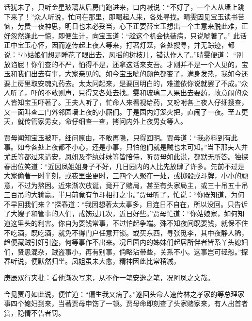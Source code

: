 \begin{parag}
    话犹未了，只听金星玻璃从后房门跑进来，口内喊说：“不好了，一个人从墙上跳下来了！”众人听说，忙问在那里，即喝起人来，各处寻找。晴雯因见宝玉读书苦恼，劳费一夜神思，明日也未必妥当，心下正要替宝玉想出一个主意来脱此难，正好忽然逢此一惊，即便生计，向宝玉道：“趁这个机会快装病，只说唬著了。” 此话正中宝玉心怀，因而遂传起上夜人等来，打著灯笼，各处搜寻，并无踪迹，都说：“小姑娘们想是睡花了眼出去，风摇的树枝儿，错认作人了。”晴雯便道： “别放诌屁！你们查的不严，怕得不是，还拿这话来支吾。才刚并不是一个人见的，宝玉和我们出去有事，大家亲见的。如今宝玉唬的颜色都变了，满身发热，我如今还要上房里取安魂丸药去。太太问起来，是要回明白的，难道依你说就罢了不成。”众人听了，吓的不敢则声，只得又各处去找。雯和玻璃二人果出去要药，故意闹的众人皆知宝玉吓著了。王夫人听了，忙命人来看视给药，又吩咐各上夜人仔细搜查，又一面叫查二门外邻园墙上夜的小厮们。于是园内灯笼火把，直闹了一夜。至五更天，就传管家男女，命仔细查一查，拷问内外上夜男女等人。
\end{parag}


\begin{parag}
    贾母闻知宝玉被吓，细问原由，不敢再隐，只得回明。贾母道：“我必料到有此事。如今各处上夜都不小心，还是小事，只怕他们就是贼也未可知。”当下邢夫人并尤氏等都过来请安，凤姐及李纨姊妹等皆陪侍，听贾母如此说，都默无所答。独探春出位笑道：“近因凤姐姐身子不好，几日园内的人比先放肆了许多。先前不过是大家偷著一时半刻，或夜里坐更时，三四个人聚在一处，或掷骰或斗牌，小小的顽意，不过为熬困。近来渐次放诞，竟开了赌局，甚至有头家局主，或三十吊五十吊三百吊的大输赢。半月前竟有争斗相打之事。”贾母听了，忙说：“你既知道，为何不早回我们来？”探春道：“我因想著太太事多，且连日不自在，所以没回。只告诉了大嫂子和管事的人们，戒饬过几次，近日好些。”贾母忙道：“你姑娘家，如何知道这里头的利害。你自为耍钱常事，不过怕起争端。殊不知夜间既耍钱，就保不住不吃酒，既吃酒，就免不得门户任意开锁。或买东西，寻张觅李，其中夜静人稀，趋便藏贼引奸引盗，何等事作不出来。况且园内的姊妹们起居所伴者皆系丫头媳妇们，贤愚混杂，贼盗事小，再有别事，倘略沾带些，关系不小。这事岂可轻恕。”探春听说，便默然归坐。凤姐虽未大愈，精神因此比常稍减，\begin{note}庚辰双行夹批：看他渐次写来，从不作一笔安逸之笔，况阿凤之文哉。\end{note}今见贾母如此说，便忙道：“偏生我又病了。”遂回头命人速传林之孝家的等总理家事四个媳妇到来，当著贾母申饬了一顿。贾母命即刻查了头家赌家来，有人出首者赏，隐情不告者罚。
\end{parag}


